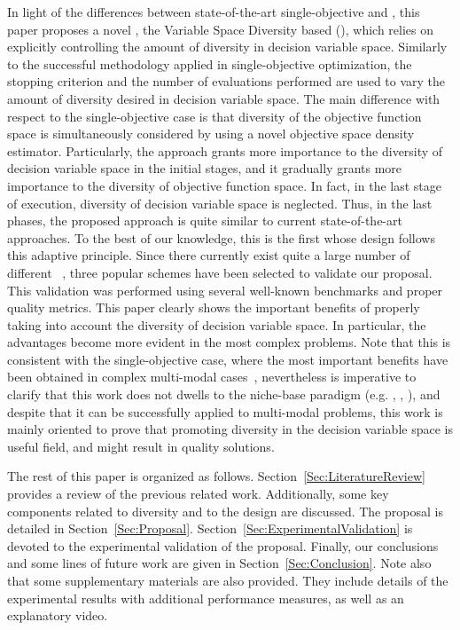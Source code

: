 In light of the differences between state-of-the-art single-objective \EAS{} and \MOEAS{}, 
this paper proposes a novel \MOEA{}, the Variable Space Diversity based \MOEA{} (\VSDMOEA{}), 
which relies on explicitly controlling the amount of diversity in decision variable space.
%
Similarly to the successful methodology applied in single-objective optimization, the stopping criterion and the 
number of evaluations performed are used to vary the amount of diversity desired in decision variable space.
%
The main difference with respect to the single-objective case is that diversity of the objective function space 
is simultaneously considered by using a novel objective space density estimator.
%
Particularly, the approach grants more importance to the diversity of decision variable space in the initial stages, and 
it gradually grants more importance to the diversity of objective function space.
%
In fact, in the last stage of execution, diversity of decision variable space is neglected. Thus, 
in the last phases, the proposed approach is quite similar to current state-of-the-art approaches.
%
To the best of our knowledge, this is the first \MOEA{} whose design follows this adaptive principle.
%
Since there currently exist quite a large number of different \MOEAS{}~\citep{Joel:MOEA_APPLICATIONS_BOOK_KCTAN}, 
three popular schemes have been selected to validate our proposal.
%
This validation was performed using several well-known benchmarks and proper quality metrics.
%
This paper clearly shows the important benefits of properly taking into account the diversity of decision variable space.
%
In particular, the advantages become more evident in the most complex problems.
%
Note that this is consistent with the single-objective case, where the most important benefits have been obtained
in complex multi-modal cases~\citep{Segura:17}, nevertheless is imperative to clarify that this work does not dwells to the niche-base paradigm (e.g. \cite{liang2016multimodal}, \cite{deb2005omni}, \cite{li2016seeking}), and despite that it can be successfully applied to multi-modal problems, this work is mainly oriented to prove that promoting diversity in the decision variable space is useful \MOEAS{} field, and might result in quality solutions.

The rest of this paper is organized as follows. 
%
Section~\ref{Sec:LiteratureReview} provides a review of the previous related work.
%
Additionally, some key components related to diversity and to the \VSDMOEA{} design are discussed.
%
The \VSDMOEA{} proposal is detailed in Section~\ref{Sec:Proposal}.
%
Section~\ref{Sec:ExperimentalValidation} is devoted to the experimental validation of the proposal.
%
Finally, our conclusions and some lines of future work are given in Section~\ref{Sec:Conclusion}.
%
Note also that some supplementary materials are also provided.
%
They include details of the experimental results with additional performance measures, 
as well as an explanatory video.
